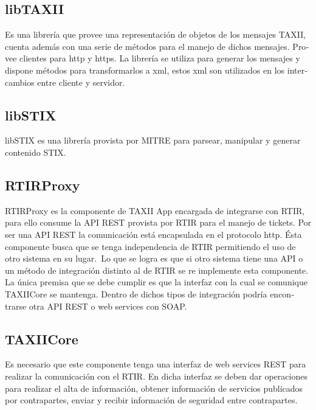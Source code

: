 	\subsection[libTAXII]{\foreignlanguage{spanish}{libTAXII}}
	\foreignlanguage{spanish}{Es una librería que provee una representación de objetos de los mensajes TAXII, cuenta además
		con una serie de métodos para el manejo de dichos mensajes. Provee clientes para http y https. La librería se utiliza
		para generar los mensajes y dispone métodos para transformarlos a xml, estos xml son utilizados en los intercambios
		entre cliente y servidor.}
	
	\subsection[libSTIX]{\foreignlanguage{spanish}{libSTIX}}
	\foreignlanguage{spanish}{libSTIX es una librería provista por MITRE para parsear, manipular y generar contenido STIX.}
	
	\subsection[RTIRProxy]{\foreignlanguage{spanish}{RTIRProxy}}
	\foreignlanguage{spanish}{RTIRProxy es la componente de TAXII App encargada de integrarse con RTIR, para ello consume la
		API REST provista por RTIR para el manejo de tickets. Por ser una API REST la comunicación está encapsulada en el
		protocolo http. Ésta componente busca que se tenga independencia de RTIR permitiendo el uso de otro sistema en su
		lugar.}\foreignlanguage{spanish}{\ Lo que se logra es que si otro sistema tiene una API
		o un método de integración distinto al de RTIR se re implemente esta componente. La única premisa que se debe cumplir
		es que la interfaz con la cual se comunique TAXIICore se mantenga. Dentro de dichos tipos de integración podría
		encontrarse otra API REST o web services con SOAP. }
	
	\subsection[TAXIICore]{\foreignlanguage{spanish}{TAXIICore}}
	\foreignlanguage{spanish}{Es necesario que este componente tenga una interfaz de web services REST para realizar la
		comunicación con el RTIR. En dicha interfaz se deben dar operaciones para realizar el alta de información, obtener
		información de servicios publicados por contrapartes, enviar y recibir información de seguridad entre contrapartes.}
	
